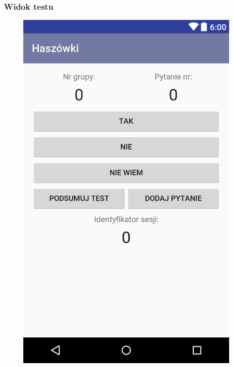 \documentclass{beamer}
\begin{document}
  \begin{frame}
	\frametitle{Widok testu}
	\begin{center}
		\begin{figure}[ht]
			\centering
			\includegraphics[scale=0.15]{layout-2016-11-29-223644.png}
		\end{figure}
	\end{center}
  \end{frame}
\end{document}
